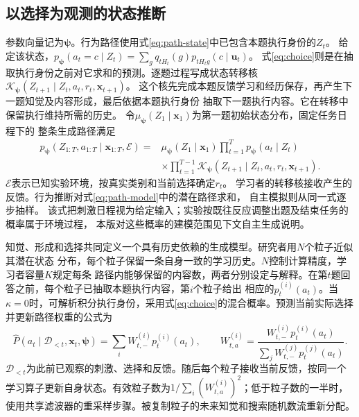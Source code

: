 \documentclass[11pt,a4paper]{article}
\numberwithin{equation}{section}
\begin{document}
\subsection{以选择为观测的状态推断}
参数向量记为$\boldsymbol\psi$。行为路径使用式\eqref{eq:path-state}中已包含本题执行身份的$Z_t$。
给定该状态，$p_{\boldsymbol\psi}(a_t=c\mid Z_t)=\sum_gq_{tH_t}(g)p_{tH_tg}(c\mid\bm u_t)$。
式\eqref{eq:choice}则是在抽取执行身份之前对它求和的预测。逐题过程写成状态转移核
$\mathcal K_{\boldsymbol\psi}(Z_{t+1}\mid Z_t,a_t,r_t,\bm x_{t+1})$。
这个核先完成本题反馈学习和经历保存，再产生下一题知觉及内容形成，最后依据本题执行身份
抽取下一题执行内容。它在转移中保留执行维持所需的历史。
令$\mu_{\boldsymbol\psi}(Z_1\mid\bm x_1)$为第一题初始状态分布，固定任务日程下的
整条生成路径满足
\begin{equation}
\begin{split}
p_{\boldsymbol\psi}(Z_{1:T},a_{1:T}\mid\bm x_{1:T},\mathcal E)
={}&\mu_{\boldsymbol\psi}(Z_1\mid\bm x_1)
\prod_{t=1}^{T}p_{\boldsymbol\psi}(a_t\mid Z_t)\\
&\times\prod_{t=1}^{T-1}
\mathcal K_{\boldsymbol\psi}(Z_{t+1}\mid Z_t,a_t,r_t,\bm x_{t+1}).
\end{split}
\label{eq:path-model}
\end{equation}
$\mathcal E$表示已知实验环境，按真实类别和当前选择确定$r_t$。
学习者的转移核接收产生的反馈。行为推断对式\eqref{eq:path-model}中的潜在路径求和，
自主模拟则从同一式逐步抽样。
该式把刺激日程视为给定输入；实验按既往反应调整出题及结束任务的概率属于环境过程，
本版对这些概率的建模范围见下文自主生成说明。

知觉、形成和选择共同定义一个具有历史依赖的生成模型。研究者用$N$个粒子近似其潜在状态
分布，每个粒子保留一条自身一致的学习历史。$N$控制计算精度，学习者容量$K$规定每条
路径内能够保留的内容数，两者分别设定与解释。在第$t$题回答之前，每个粒子已抽取本题执行内容，第$i$个粒子给出
相应的$p_t^{(i)}(a_t)$。当$\kappa=0$时，可解析积分执行身份，采用式\eqref{eq:choice}的混合概率。预测当前实际选择并更新路径权重的公式为
\begin{equation}
\widehat P(a_t\mid\mathcal D_{<t},\bm x_t,\boldsymbol\psi)
=\sum_iW_{t,-}^{(i)}p_t^{(i)}(a_t),\qquad
W_{t,a}^{(i)}=\frac{W_{t,-}^{(i)}p_t^{(i)}(a_t)}{\sum_jW_{t,-}^{(j)}p_t^{(j)}(a_t)}.
\label{eq:filter}
\end{equation}
$\mathcal D_{<t}$为此前已观察的刺激、选择和反馈。随后每个粒子接收当前反馈，按同一个
学习算子更新自身状态。有效粒子数为$1/\sum_i(W_{t,a}^{(i)})^2$；低于粒子数的一半时，
使用共享滤波器的重采样步骤。被复制粒子的未来知觉和搜索随机数流重新分配。
\end{document}
